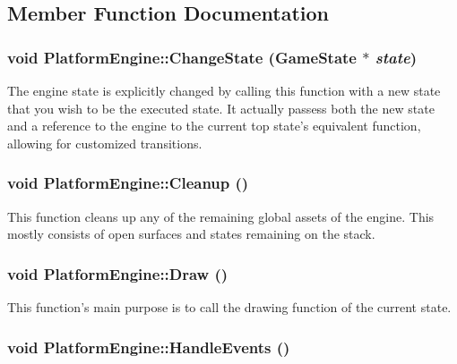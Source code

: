 \subsection{Member Function Documentation}
\hypertarget{class_platform_engine_d2b335545c9ab6bce7be7c014bc8c528}{
\subsubsection[{ChangeState}]{\setlength{\rightskip}{0pt plus 5cm}void PlatformEngine::ChangeState ({\bf GameState} $\ast$ {\em state})}}
\label{class_platform_engine_d2b335545c9ab6bce7be7c014bc8c528}


The engine state is explicitly changed by calling this function with a new state that you wish to be the executed state. It actually passess both the new state and a reference to the engine to the current top state's equivalent function, allowing for customized transitions. \hypertarget{class_platform_engine_361b54312d9ec2fa842cd982f67100f9}{
\subsubsection[{Cleanup}]{\setlength{\rightskip}{0pt plus 5cm}void PlatformEngine::Cleanup ()}}
\label{class_platform_engine_361b54312d9ec2fa842cd982f67100f9}


This function cleans up any of the remaining global assets of the engine. This mostly consists of open surfaces and states remaining on the stack. \hypertarget{class_platform_engine_cd756d58f81c5e28efe98ae075367a5c}{
\subsubsection[{Draw}]{\setlength{\rightskip}{0pt plus 5cm}void PlatformEngine::Draw ()}}
\label{class_platform_engine_cd756d58f81c5e28efe98ae075367a5c}


This function's main purpose is to call the drawing function of the current state. \hypertarget{class_platform_engine_7fc47bff353292f1a1435d78664df36d}{
\subsubsection[{HandleEvents}]{\setlength{\rightskip}{0pt plus 5cm}void PlatformEngine::HandleEvents ()}}
\label{class_platform_engine_7fc47bff353292f1a1435d78664df36d}


